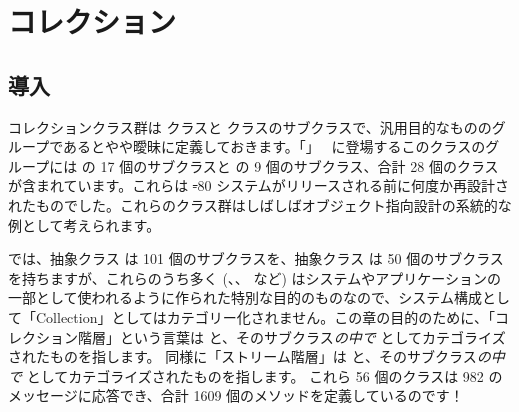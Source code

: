 \documentclass[a4paper,10pt,twoside]{book}
\begin{document}
	\sloppy
\fi
\chapter{コレクション}

\section{導入}

コレクションクラス群は  クラスと  クラスのサブクラスで、汎用目的なもののグループであるとやや曖昧に定義しておきます。「」~\cite{Gold83a} に登場するこのクラスのグループには  の 17 個のサブクラスと   の 9 個のサブクラス、合計 28 個のクラスが含まれています。これらは \st-80 システムがリリースされる前に何度か再設計されたものでした。これらのクラス群はしばしばオブジェクト指向設計の系統的な例として考えられます。

\pharo では、抽象クラス  は 101 個のサブクラスを、抽象クラス  は 50 個のサブクラスを持ちますが、これらのうち多く (\mbox{、}\mbox{、} など) はシステムやアプリケーションの一部として使われるように作られた特別な目的のものなので、システム構成として「Collection」としてはカテゴリー化されません。この章の目的のために、「コレクション階層」という言葉は  と、そのサブクラス\emph{の中で}  としてカテゴライズされたものを指します。
同様に「ストリーム階層」は  と、そのサブクラス\emph{の中で}  としてカテゴライズされたものを指します。
これら 56 個のクラスは 982 のメッセージに応答でき、合計 1609 個のメソッドを定義しているのです！

\end{document}
